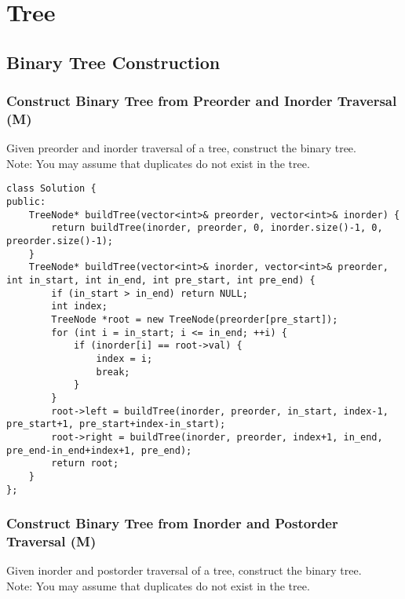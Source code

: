 \chapter{Tree}
\section{Binary Tree Construction}
\subsection{Construct Binary Tree from Preorder and Inorder Traversal (M)}
Given preorder and inorder traversal of a tree, construct the binary tree.\\

Note: You may assume that duplicates do not exist in the tree. \\

\begin{lstlisting}
class Solution {
public:
    TreeNode* buildTree(vector<int>& preorder, vector<int>& inorder) {
        return buildTree(inorder, preorder, 0, inorder.size()-1, 0, preorder.size()-1);
    }
    TreeNode* buildTree(vector<int>& inorder, vector<int>& preorder, int in_start, int in_end, int pre_start, int pre_end) {
        if (in_start > in_end) return NULL;
        int index;
        TreeNode *root = new TreeNode(preorder[pre_start]);
        for (int i = in_start; i <= in_end; ++i) {
            if (inorder[i] == root->val) {
                index = i;
                break;
            }
        }
        root->left = buildTree(inorder, preorder, in_start, index-1, pre_start+1, pre_start+index-in_start);
        root->right = buildTree(inorder, preorder, index+1, in_end, pre_end-in_end+index+1, pre_end);
        return root;
    }
};
\end{lstlisting}


\subsection{Construct Binary Tree from Inorder and Postorder Traversal (M)}
Given inorder and postorder traversal of a tree, construct the binary tree. \\

Note: You may assume that duplicates do not exist in the tree. \\

